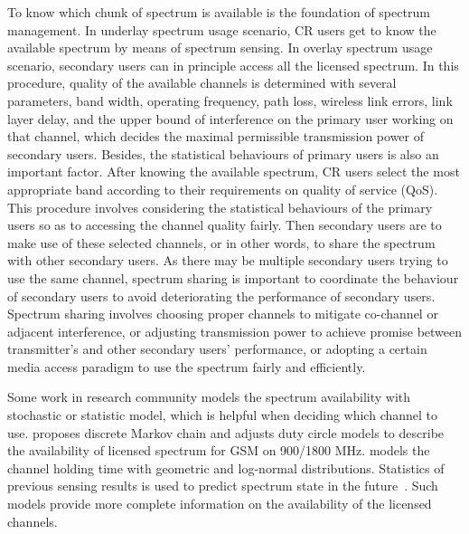 To know which chunk of spectrum is available is the foundation of spectrum management.
In underlay spectrum usage scenario, CR users get to know the available spectrum by means of spectrum sensing.
In overlay spectrum usage scenario, secondary users can in principle access all the licensed spectrum.
In this procedure, quality of the available channels is determined with several parameters, \ie band width, operating frequency, path loss, wireless link errors, link layer delay, and the upper bound of interference on the primary user working on that channel, which decides the maximal permissible transmission power of secondary users.
Besides, the statistical behaviours of primary users is also an important factor.
%
After knowing the available spectrum, CR users select the most appropriate band according to their requirements on quality of service (QoS).
This procedure involves considering the statistical behaviours of the primary users so as to accessing the channel quality fairly.
%
Then secondary users are to make use of these selected channels, or in other words, to share the spectrum with other secondary users. 
As there may be multiple secondary users trying to use the same channel, spectrum sharing is important to coordinate the behaviour of secondary users to avoid deteriorating the performance of secondary users.
Spectrum sharing involves choosing proper channels to mitigate co-channel or adjacent interference, or adjusting transmission power to achieve promise between transmitter's and other secondary users' performance, or adopting a certain media access paradigm to use the spectrum fairly and efficiently.



Some work in research community models the spectrum availability with stochastic or statistic model, which is helpful when deciding which channel to use.
\cite{Discrete-Time_Spectrum_Occupancy_Model_DySPAN_2011} proposes discrete Markov chain and adjusts duty circle models to describe the availability of licensed spectrum for GSM on 900/1800 MHz.
\cite{Wellens200910} models the channel holding time with geometric and log-normal distributions.
Statistics of previous sensing results is used to predict spectrum state in the future~\cite{spectrum-discovery-tmc08}.
Such models provide more complete information on the availability of the licensed channels.

